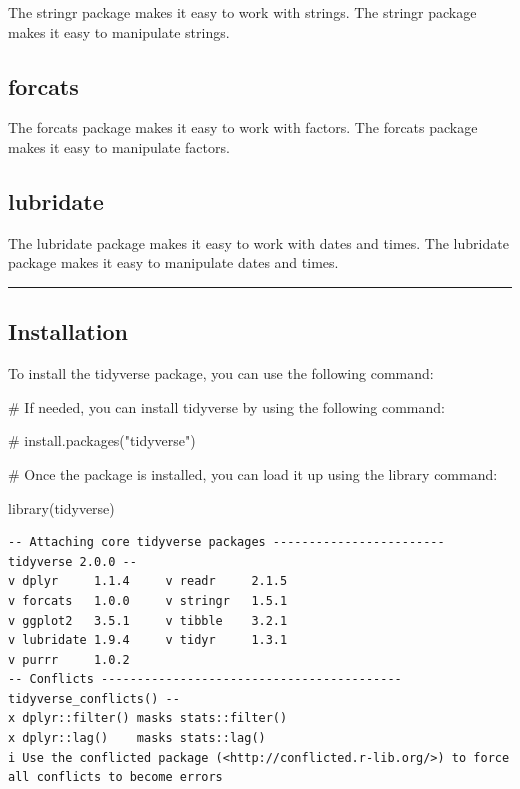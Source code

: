 \documentclass[
  letterpaper,
  DIV=11,
  numbers=noendperiod]{scrreprt}
\newenvironment{Shaded}{\begin{snugshade}}{\end{snugshade}}
\newcommand{\CommentTok}[1]{\textcolor[rgb]{0.37,0.37,0.37}{#1}}
\newcommand{\FunctionTok}[1]{\textcolor[rgb]{0.28,0.35,0.67}{#1}}
\newcommand{\NormalTok}[1]{\textcolor[rgb]{0.00,0.23,0.31}{#1}}
\begin{document}
The stringr package makes it easy to work with strings. The stringr
package makes it easy to manipulate strings.

\subsection*{forcats}\label{forcats}

The forcats package makes it easy to work with factors. The forcats
package makes it easy to manipulate factors.

\subsection*{lubridate}\label{lubridate}

The lubridate package makes it easy to work with dates and times. The
lubridate package makes it easy to manipulate dates and times.

\begin{center}\rule{0.5\linewidth}{0.5pt}\end{center}

\subsection*{Installation}\label{installation}

To install the tidyverse package, you can use the following command:

\begin{Shaded}
\begin{Highlighting}[]
\CommentTok{\# If needed, you can install tidyverse by using the following command:}

\CommentTok{\# install.packages("tidyverse")}

\CommentTok{\# Once the package is installed, you can load it up using the library command:}

\FunctionTok{library}\NormalTok{(tidyverse)}
\end{Highlighting}
\end{Shaded}

\begin{verbatim}
-- Attaching core tidyverse packages ------------------------ tidyverse 2.0.0 --
v dplyr     1.1.4     v readr     2.1.5
v forcats   1.0.0     v stringr   1.5.1
v ggplot2   3.5.1     v tibble    3.2.1
v lubridate 1.9.4     v tidyr     1.3.1
v purrr     1.0.2     
-- Conflicts ------------------------------------------ tidyverse_conflicts() --
x dplyr::filter() masks stats::filter()
x dplyr::lag()    masks stats::lag()
i Use the conflicted package (<http://conflicted.r-lib.org/>) to force all conflicts to become errors
\end{verbatim}
\end{document}
